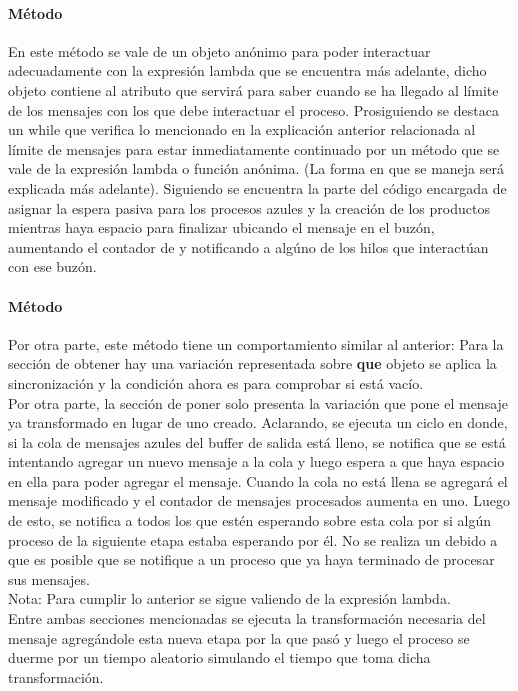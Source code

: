 \documentclass[a4paper]{article}
\begin{document}
    \paragraph{M\'etodo }
    En este m\'etodo se vale de un objeto an\'onimo para poder interactuar adecuadamente con la expresi\'on lambda que se encuentra m\'as adelante, dicho objeto contiene al atributo  que servir\'a para saber cuando se ha llegado al l\'imite de los mensajes con los que debe interactuar el proceso.
    Prosiguiendo se destaca un while que verifica lo mencionado en la explicaci\'on anterior relacionada al l\'imite de mensajes para estar inmediatamente continuado por un m\'etodo que se vale de la expresi\'on lambda o funci\'on an\'onima.
    (La forma en que se maneja ser\'a explicada m\'as adelante).
    Siguiendo se encuentra la parte del c\'odigo encargada de asignar la espera pasiva para los procesos azules y la creaci\'on de los productos mientras haya espacio para finalizar ubicando el mensaje en el buz\'on, aumentando el contador de  y notificando a alg\'uno de los hilos que interact\'uan con ese buz\'on.

    \paragraph{M\'etodo }
    Por otra parte, este m\'etodo tiene un comportamiento similar al anterior:
    Para la secci\'on de obtener hay una variaci\'on representada sobre \textbf{que} objeto se aplica la sincronizaci\'on y la condici\'on ahora es para comprobar si est\'a vac\'io.\\
    Por otra parte, la secci\'on de poner solo presenta la variaci\'on que pone el mensaje ya transformado en lugar de uno creado.
    Aclarando, se ejecuta un ciclo en donde, si la cola de mensajes azules del buffer de salida est\'a lleno, se notifica que se est\'a intentando agregar un nuevo mensaje a la cola y luego espera a que haya espacio en ella para poder agregar el mensaje.
    Cuando la cola no est\'a llena se agregar\'a el mensaje modificado y el contador de mensajes procesados aumenta en uno.
    Luego de esto, se notifica a todos los que est\'en esperando sobre esta cola por si alg\'un proceso de la siguiente etapa estaba esperando por \'el.
    No se realiza un  debido a que es posible que se notifique a un proceso que ya haya terminado de procesar sus mensajes.\\
    Nota: Para cumplir lo anterior se sigue valiendo de la expresi\'on lambda.\\
    Entre ambas secciones mencionadas se ejecuta la transformaci\'on necesaria del mensaje agreg\'andole esta nueva etapa por la que pas\'o y luego el proceso se duerme por un tiempo aleatorio simulando el tiempo que toma dicha transformaci\'on.
\end{document}
